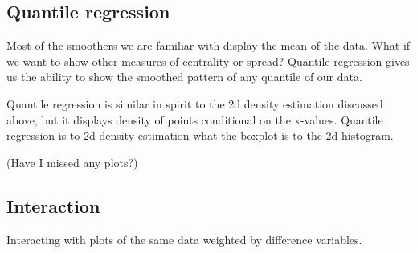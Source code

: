 \documentclass[oneside,letterpaper]{scrartcl}
\begin{document}
\subsection{Quantile regression}\label{sub:quantile_regression}

Most of the smoothers we are familiar with display the mean of the data.  What if we want to show other measures of centrality or spread?  Quantile regression gives us the ability to show the smoothed pattern of any quantile of our data.

Quantile regression is similar in spirit to the 2d density estimation discussed above, but it displays density of points conditional on the x-values.  Quantile regression is to 2d density estimation what the boxplot is to the 2d histogram.

(Have I missed any plots?)

\subsection{Interaction}\label{sub:interaction} %

Interacting with plots of the same data weighted by difference variables.


\end{document}
